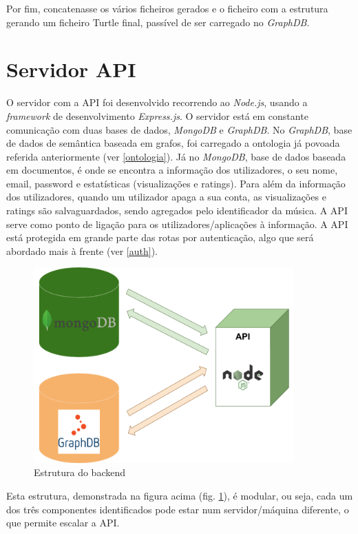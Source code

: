 \documentclass{article}
\begin{document}
Por fim, concatenasse os vários ficheiros gerados e o ficheiro com a estrutura gerando um ficheiro Turtle final, passível de ser carregado no \textit{GraphDB}.

\section{Servidor API}

O servidor com a API foi desenvolvido recorrendo ao \textit{Node.js}, usando a \textit{framework} de desenvolvimento \textit{Express.js}. O servidor está em constante comunicação com duas bases de dados, \textit{MongoDB} e \textit{GraphDB}. No \textit{GraphDB}, base de dados de semântica baseada em grafos, foi carregado a ontologia já povoada referida anteriormente (ver \ref{ontologia}). Já no \textit{MongoDB}, base de dados baseada em documentos, é onde se encontra a informação dos utilizadores, o seu nome, email, password e estatísticas (visualizações e ratings). Para além da informação dos utilizadores, quando um utilizador apaga a sua conta, as visualizações e ratings são salvaguardados, sendo agregados pelo identificador da música. A API serve como ponto de ligação para os utilizadores/aplicações à informação. A API está protegida em grande parte das rotas por autenticação, algo que será abordado mais à frente (ver \ref{auth}).

\begin{figure}[H]
    \centering
    \includegraphics[width=10cm]{Pictures/backend.png}
    \caption{Estrutura do backend}
    \label{backend}
\end{figure}

Esta estrutura, demonstrada na figura acima (fig. \ref{backend}), é modular, ou seja, cada um dos três componentes identificados pode estar num servidor/máquina diferente, o que permite escalar a API.
\end{document}
